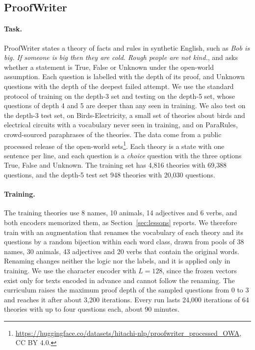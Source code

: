\documentclass{article}
\begin{document}
\subsection{ProofWriter}
\label{sec:pwresults}

\paragraph{Task.} ProofWriter \cite{tafjord2021proofwriter} states a theory of facts and rules in synthetic English, such as \emph{Bob is big. If someone is big then they are cold. Rough people are not kind.}, and asks whether a statement is True, False or Unknown under the open-world assumption. Each question is labelled with the depth of its proof, and Unknown questions with the depth of the deepest failed attempt. We use the standard protocol of training on the depth-3 set and testing on the depth-5 set, whose questions of depth 4 and 5 are deeper than any seen in training. We also test on the depth-3 test set, on Birds-Electricity, a small set of theories about birds and electrical circuits with a vocabulary never seen in training, and on ParaRules, crowd-sourced paraphrases of the theories. The data come from a public processed release of the open-world sets\footnote{\url{https://huggingface.co/datasets/hitachi-nlp/proofwriter_processed_OWA}, CC BY 4.0.}. Each theory is a state with one sentence per line, and each question is a \emph{choice} question with the three options True, False and Unknown. The training set has 4{,}816 theories with 69{,}388 questions, and the depth-5 test set 948 theories with 20{,}030 questions.

\paragraph{Training.} The training theories use 8 names, 10 animals, 14 adjectives and 6 verbs, and both encoders memorized them, as Section~\ref{sec:lessons} reports. We therefore train with an augmentation that renames the vocabulary of each theory and its questions by a random bijection within each word class, drawn from pools of 38 names, 30 animals, 43 adjectives and 20 verbs that contain the original words. Renaming changes neither the logic nor the labels, and it is applied only in training. We use the character encoder with $L = 128$, since the frozen vectors exist only for texts encoded in advance and cannot follow the renaming. The curriculum raises the maximum proof depth of the sampled questions from 0 to 3 and reaches it after about 3{,}200 iterations. Every run lasts 24{,}000 iterations of 64 theories with up to four questions each, about 90 minutes.
\end{document}
